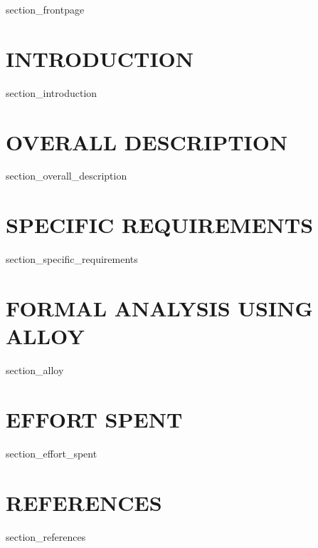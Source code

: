 \documentclass[a4paper]{article}
\begin{document}
{section_frontpage}

\newpage
{}

\tableofcontents

\newpage
{}

\section{INTRODUCTION}\label{introduction}

{section_introduction}

\newpage

\section{OVERALL DESCRIPTION}\label{overall_description}

{section_overall_description}

\newpage

\section{SPECIFIC REQUIREMENTS}\label{specific_requirements}

{section_specific_requirements}

\newpage

\section{FORMAL ANALYSIS USING ALLOY}\label{formal_analysis_using_alloy}

{section_alloy}

\newpage

\section{EFFORT SPENT}\label{effort_spent}

{section_effort_spent}

\section{REFERENCES}\label{references}

{section_references}
\end{document}
